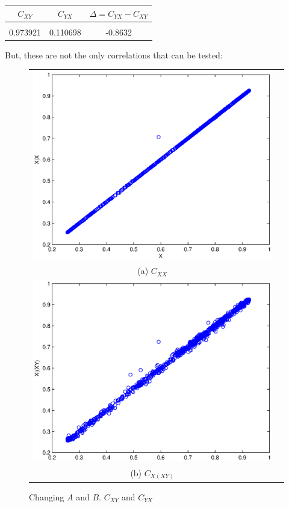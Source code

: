 \documentclass{article}
\begin{document}
\begin{tabular}{c|c|c}
$C_{XY}$ & $C_{YX}$ & $\Delta=C_{YX}-C_{XY}$ \\
\hline \\
0.973921 & 0.110698 & -0.8632
\end{tabular}

But, these are not the only correlations that can be tested:
\begin{center}
\begin{figure}[H]
\begin{tabular}{cc}
\includegraphics[scale=0.5]{SugFig3_XgX.eps} \\
(a) $C_{XX}$ \\[6pt]
\includegraphics[scale=0.5]{SugFig3_XgXY.eps} \\
(b) $C_{X(XY)}$ \\[6pt]
\end{tabular}
\caption{Changing $A$ and $B$.  $C_{XY}$ and $C_{YX}$}
\label{fig1}
\end{figure}
\end{center}
\end{document}
